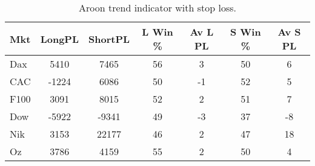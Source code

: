 \begin{table}[ht]
\centering
\caption[Aroon trend indicator with Stop Loss]{Aroon trend indicator with stop loss.} 
\label{tab:aroon_results_sloss}
\begin{tabular}{lcccccc}
  \toprule Mkt & LongPL & ShortPL & L Win \% & Av L PL & S Win \% & Av S PL \\ 
  \midrule Dax & 5410 & 7465 & 56 & 3 & 50 & 6 \\ 
  CAC & -1224 & 6086 & 50 & -1 & 52 & 5 \\ 
  F100 & 3091 & 8015 & 52 & 2 & 51 & 7 \\ 
  Dow & -5922 & -9341 & 49 & -3 & 37 & -8 \\ 
  Nik & 3153 & 22177 & 46 & 2 & 47 & 18 \\ 
  Oz & 3786 & 4159 & 55 & 2 & 50 & 4 \\ 
   \bottomrule \end{tabular}
\end{table}
